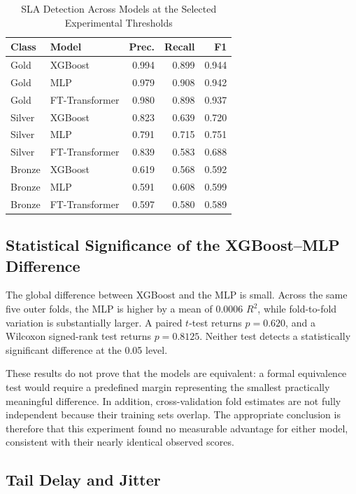 \documentclass[conference]{IEEEtran}
\begin{document}
\begin{table}[t]
\caption{SLA Detection Across Models at the Selected Experimental Thresholds}
\label{tab:model_sla}
\centering
\setlength{\tabcolsep}{3pt}
\begin{tabular}{llrrr}
\toprule
Class & Model & Prec. & Recall & F1 \\
\midrule
Gold   & XGBoost        & 0.994 & 0.899 & 0.944 \\
Gold   & MLP            & 0.979 & 0.908 & 0.942 \\
Gold   & FT-Transformer & 0.980 & 0.898 & 0.937 \\
Silver & XGBoost        & 0.823 & 0.639 & 0.720 \\
Silver & MLP            & 0.791 & 0.715 & 0.751 \\
Silver & FT-Transformer & 0.839 & 0.583 & 0.688 \\
Bronze & XGBoost        & 0.619 & 0.568 & 0.592 \\
Bronze & MLP            & 0.591 & 0.608 & 0.599 \\
Bronze & FT-Transformer & 0.597 & 0.580 & 0.589 \\
\bottomrule
\end{tabular}
\end{table}

\subsection{Statistical Significance of the XGBoost--MLP Difference}

The global difference between XGBoost and the MLP is small. Across the same five outer folds, the MLP is higher by a mean of 0.0006 $R^2$, while fold-to-fold variation is substantially larger. A paired $t$-test returns $p=0.620$, and a Wilcoxon signed-rank test returns $p=0.8125$. Neither test detects a statistically significant difference at the 0.05 level.

These results do not prove that the models are equivalent: a formal equivalence test would require a predefined margin representing the smallest practically meaningful difference. In addition, cross-validation fold estimates are not fully independent because their training sets overlap. The appropriate conclusion is therefore that this experiment found no measurable advantage for either model, consistent with their nearly identical observed scores.

\subsection{Tail Delay and Jitter}
\end{document}
